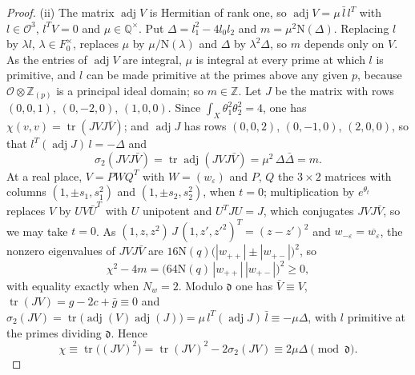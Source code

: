 \documentclass[11pt,reqno]{amsart}
\theoremstyle{plain}
\theoremstyle{definition}
\theoremstyle{remark}
\newcommand{\QQ}{\mathbb{Q}}
\newcommand{\ZZ}{\mathbb{Z}}
\newcommand{\cO}{\mathcal{O}}
\newcommand{\Nm}{\mathrm{N}}             %
\begin{document}
\begin{proof}
(ii) The matrix $\operatorname{adj}V$ is Hermitian of rank one, so
$\operatorname{adj}V=\mu\,\bar l\,l^{T}$ with $l\in\cO^{3}$, $l^{T}V=0$ and
$\mu\in\QQ^{\times}$. Put $\Delta=l_{1}^{2}-4l_{0}l_{2}$ and
$m=\mu^{2}\Nm(\Delta)$. Replacing $l$ by $\lambda l$, $\lambda\in F_{0}^{\times}$,
replaces $\mu$ by $\mu/\Nm(\lambda)$ and $\Delta$ by $\lambda^{2}\Delta$, so $m$
depends only on $V$. As the entries of $\operatorname{adj}V$ are integral,
$\mu$ is integral at every prime at which $l$ is primitive, and $l$ can be
made primitive at the primes above any given $p$, because
$\cO\otimes\ZZ_{(p)}$ is a principal ideal domain; so $m\in\ZZ$. Let $J$ be
the matrix with rows $(0,0,1)$, $(0,-2,0)$, $(1,0,0)$. Since
$\int_{X}\theta_{1}^{2}\theta_{2}^{2}=4$, one has $\chi(v,v)=\operatorname{tr}
(JVJ\bar V)$; and $\operatorname{adj}J$ has rows $(0,0,2)$, $(0,-1,0)$,
$(2,0,0)$, so that $l^{T}(\operatorname{adj}J)\,l=-\Delta$ and
\[
  \sigma_{2}(JVJ\bar V)=\operatorname{tr}\operatorname{adj}(JVJ\bar V)
  =\mu^{2}\,\Delta\bar\Delta=m .
\]
At a real place, $V=PWQ^{T}$ with $W=(w_{\varepsilon})$ and $P$, $Q$ the
$3\times2$ matrices with columns $(1,\pm s_{1},s_{1}^{2})$ and
$(1,\pm s_{2},s_{2}^{2})$, when $t=0$; multiplication by $e^{\theta_{t}}$
replaces $V$ by $UV\bar U^{T}$ with $U$ unipotent and $U^{T}JU=J$, which
conjugates $JVJ\bar V$, so we may take $t=0$. As
$(1,z,z^{2})\,J\,(1,z',z'^{2})^{T}=(z-z')^{2}$ and
$w_{-\varepsilon}=\overline{w_{\varepsilon}}$, the nonzero eigenvalues of
$JVJ\bar V$ are $16\Nm(q)\bigl(|w_{++}|\pm|w_{+-}|\bigr)^{2}$, so
\[
  \chi^{2}-4m=\bigl(64\Nm(q)\,|w_{++}|\,|w_{+-}|\bigr)^{2}\ge0,
\]
with equality exactly when $N_{w}=2$. Modulo $\mathfrak d$ one has
$\bar V\equiv V$, $\operatorname{tr}(JV)=g-2c+\bar g\equiv0$ and
$\sigma_{2}(JV)=\operatorname{tr}\bigl(\operatorname{adj}(V)\operatorname{adj}(J)\bigr)
=\mu\,l^{T}(\operatorname{adj}J)\,\bar l\equiv-\mu\Delta$, with $l$ primitive at
the primes dividing $\mathfrak d$. Hence
\[
  \chi\equiv\operatorname{tr}\bigl((JV)^{2}\bigr)
  =\operatorname{tr}(JV)^{2}-2\sigma_{2}(JV)\equiv2\mu\Delta
  \pmod{\mathfrak d}.
\]


\end{proof}
\end{document}
